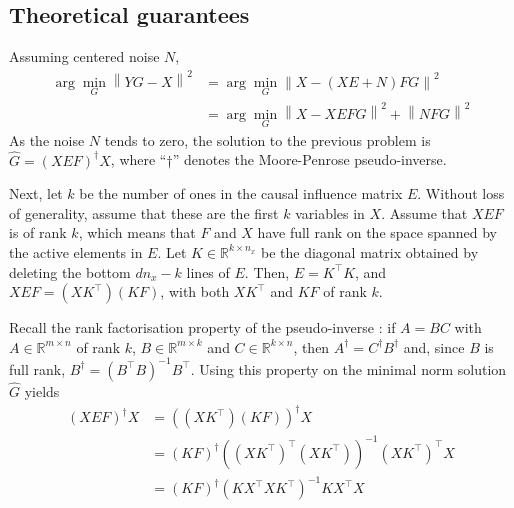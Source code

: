 \documentclass{article}
\begin{document}
\subsection{Theoretical guarantees}
\label{sec:theorem}
%

Assuming centered noise $N$,
\begin{align*}
    \arg \min_G \left \| YG - X \right \|^2 &= \arg \min_G \left \| X - (XE + N)FG \right\|^2 \\
                                            &{}= \arg \min_G \left \| X - XEFG\right\| ^2  + \left \| NFG\right \| ^2
\end{align*}
%
As the noise $N$ tends to zero, the solution to the previous problem is $\hat G = (X E F)^\dagger X$, where ``$\dagger$'' denotes the Moore-Penrose pseudo-inverse.

Next, let $k$ be the number of ones in the causal influence matrix $E$.
%
Without loss of generality, assume that these are the first $k$ variables in $X$.
%
Assume that $XEF$ is of rank $k$, which means that $F$ and $X$ have full rank on the space spanned by the active elements in $E$.
%
Let $K \in \mathbb{R}^{k \times n_{x}}$ be the diagonal matrix obtained by deleting the bottom $dn_{x} - k$ lines of $E$.
%
Then, $E = K^\top K$, and $XEF = (XK^\top)(KF)$, with both $XK^\top$ and $KF$ of rank $k$.

Recall the rank factorisation property of the pseudo-inverse \citep{ben2003generalize}: if $A=BC$ with $A\in\mathbb{R}^{m\times n}$ of rank $k$, $B\in\mathbb{R}^{m\times k}$ and $C\in\mathbb{R}^{k\times n}$, then $A^\dagger=C^\dagger B^\dagger$ and, since $B$ is full rank, $B^\dagger=(B^\top B)^{-1} B^\top$.
%
Using this property on the minimal norm solution $\hat G$ yields
\begin{equation}
\begin{aligned}
(XEF)^\dagger X&=((XK^\top)(KF))^\dagger X\\
&=(KF)^\dagger ((XK^\top)^\top (XK^\top))^{-1} (XK^\top)^\top X\\
&=(KF)^\dagger (KX^\top XK^\top)^{-1} KX^\top X
\end{aligned}
\end{equation}
\end{document}
